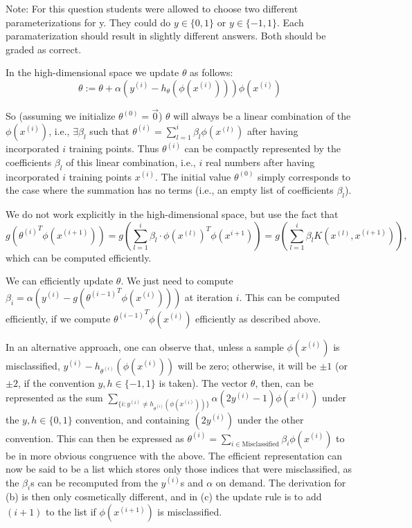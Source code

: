 \begin{answer}

  Note: For this question students were allowed to choose two different parameterizations for y. They could do $y \in \{0, 1\}$ or $y \in \{-1, 1\}$.
  Each paramaterization should result in slightly different answers. Both should be graded as correct.

  In the high-dimensional space we update $\theta$ as follows:
  \[ \theta := \theta + \alpha(y^{(i)} - h_\theta(\phi(x^{(i)})))
  \phi(x^{(i)}) \]

  So (assuming we initialize $\theta^{(0)} = \vec{0}$) $\theta$ will always be
  a linear combination of the $\phi(x^{(i)})$, i.e., $\exists \beta_l$
  such that $\theta^{(i)} = \sum_{l=1}^i \beta_l \phi(x^{(l)})$ after having
  incorporated $i$ training points.  Thus $\theta^{(i)}$ can be compactly
  represented by the coefficients $\beta_l$ of this linear
  combination, i.e., $i$ real numbers after having incorporated $i$
  training points $x^{(i)}$.  The initial value $\theta^{(0)}$ simply
  corresponds to the case where the summation has no terms (i.e., an empty list
  of coefficients $\beta_l$).

  We do not work explicitly in the high-dimensional space, but use the
  fact that
  $$
  g({\theta^{(i)}}^T \phi(x^{(i+1)}))
  = g(\sum_{l=1}^i \beta_l \cdot \phi(x^{(l)})^T \phi(x^{i+1}))
  = g(\sum_{l=1}^i \beta_l K(x^{(l)}, x^{(i+1)})),
  $$
  which can be computed efficiently.

  We can efficiently update $\theta$. We just need to compute $\beta_i
  = \alpha(y^{(i)} - g({\theta^{(i-1)}}^T \phi(x^{(i)})))$ at iteration $i$.
  This can be computed efficiently, if we compute ${\theta^{(i-1)}}^T
  \phi(x^{(i)})$ efficiently as described above.

  In an alternative approach, one can observe that, unless a sample
  $\phi(x^{(i)})$ is misclassified, $y^{(i)} - h_{\theta^{(i)}}(
  \phi(x^{(i)}) )$ will be zero; otherwise, it will be $\pm 1$ (or $\pm 2$, if
  the convention $y, h \in \{-1, 1\}$ is taken). The vector $\theta$, then, can
  be represented as the sum
  $\sum_{ \{ i : y^{(i)} \ne h_{\theta^{(i)}}( \phi(x^{(i)}) ) \} }
  \alpha (2y^{(i)} - 1) \phi(x^{(i)})$ under the $y,h \in \{0,1\}$ convention,
  and containing $(2 y^{(i)})$ under the other convention. This can then be
  expressed as $\theta^{(i)} = \sum_{i \in \text{Misclassified} } \beta_i
  \phi(x^{(i)})$ to be in more obvious congruence with the above. The efficient
  representation can now be said to be a list which stores only those indices
  that were misclassified, as the $\beta_i$s can be recomputed from the
  $y^{(i)}$s and $\alpha$ on demand. The derivation for (b) is then only
  cosmetically different, and in (c) the update rule is to add $(i+1)$ to the
  list if $\phi(x^{(i+1)})$ is misclassified.
\end{answer}
